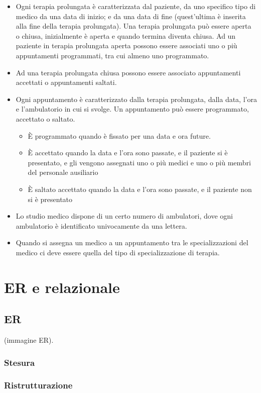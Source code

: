 \documentclass[11pt]{article}
\begin{document}
\begin{itemize}
    \item Ogni terapia prolungata è caratterizzata dal paziente, da uno specifico tipo di medico da una data di inizio; e da una data di fine (quest’ultima è inserita alla fine della terapia prolungata). Una terapia prolungata può essere aperta o chiusa, inizialmente è aperta e quando termina diventa chiusa. Ad un paziente in terapia prolungata aperta possono essere associati uno o più appuntamenti programmati, tra cui almeno uno programmato.
    \item Ad una terapia prolungata chiusa possono essere associato appuntamenti accettati o appuntamenti saltati.
    \item Ogni appuntamento è caratterizzato dalla terapia prolungata, dalla data, l’ora e l’ambulatorio in cui si svolge. Un appuntamento può essere programmato, accettato o saltato.
    \begin{itemize}
        \item È programmato quando è fissato per una data e ora future.
        \item È accettato quando la data e l’ora sono passate, e il paziente si è presentato, e gli vengono assegnati uno o più medici e uno o più membri del personale ausiliario
        \item È saltato accettato quando la data e l’ora sono passate, e il paziente non si è presentato
    \end{itemize} 
    \item Lo studio medico dispone di un certo numero di ambulatori, dove ogni ambulatorio è identificato univocamente da una lettera.
    \item Quando si assegna un medico a un appuntamento tra le specializzazioni del medico ci deve essere quella del tipo di specializzazione di terapia.

\end{itemize}

\section{ER e relazionale}

\subsection{ER}
(immagine ER).
\subsubsection{Stesura}
\subsubsection{Ristrutturazione}
\end{document}
